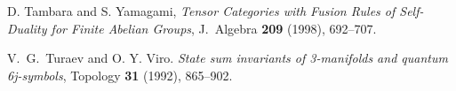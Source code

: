 \documentclass{amsart}
\begin{document}
\begin{thebibliography}{9999}
 D. Tambara and S. Yamagami, \emph{Tensor Categories with Fusion Rules of Self-Duality for Finite Abelian Groups}, J.\ Algebra \textbf{209} (1998), 692--707.



 V.\ G.\ Turaev and O. Y. Viro. {\em State sum invariants of 3-manifolds and quantum 6j-symbols}, Topology \textbf{31} (1992), 865--902.






\end{thebibliography}
\end{document}
